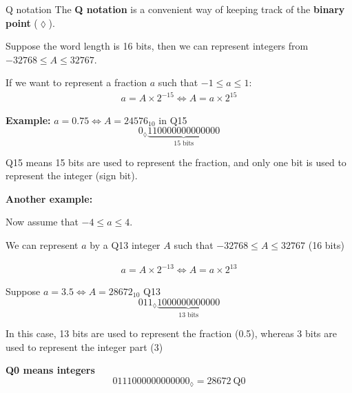 \documentclass[10pt]{beamer}
\begin{document}
%
\begin{frame}{Q notation}
	The \textbf{Q notation} is a convenient way of keeping track of the \textbf{binary point} ($\lozenge$).
	
	Suppose the word length is 16 bits, then we can represent integers from $-32768 \leq A \leq 32767$.
		
	If we want to represent a fraction $a$ such that $-1\leq a\leq 1$:
	\begin{align*}
	a = A\times 2^{-15} \Longleftrightarrow A = a\times 2^{15}
	\end{align*}
		
	\textbf{Example:}
	$a =  0.75 \Longleftrightarrow A = 24576_{10}$ in Q15
	\begin{equation*}
	0_\lozenge\underbrace{110000000000000}_{\text{15 bits}}
	\end{equation*}
		
	Q15 means 15 bits are used to represent the fraction, and only one bit is used to represent the integer (sign bit).
\end{frame}

%
\begin{frame}
	
	\textbf{Another example:}
	
	Now assume that $-4\leq a\leq 4$. 
	
	We can represent $a$ by a Q13 integer $A$ such that $-32768 \leq A \leq 32767$ (16 bits)
	
	\begin{align*}
	a = A\times 2^{-13} \Longleftrightarrow A = a\times 2^{13}
	\end{align*}
	
	Suppose $a =  3.5 \Longleftrightarrow A = 28672_{10}$ Q13
	\begin{equation*}
	011_\lozenge\underbrace{1000000000000}_{\text{13 bits}}
	\end{equation*}
	
	In this case, 13 bits are used to represent the fraction (0.5), whereas 3 bits are used to represent the integer part (3)
	
	\vspace{0.25cm}
	\textbf{Q0 means integers}
	\begin{equation*}
	0111000000000000_\lozenge = 28672~\text{Q0}
	\end{equation*}
\end{frame}
\end{document}
